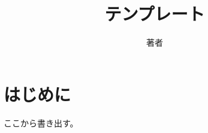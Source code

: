 \documentclass[a4paper]{jarticle}
\title{テンプレート}
\author{著者}
\begin{document}
\maketitle

\section{はじめに}
ここから書き出す。
\end{document}

